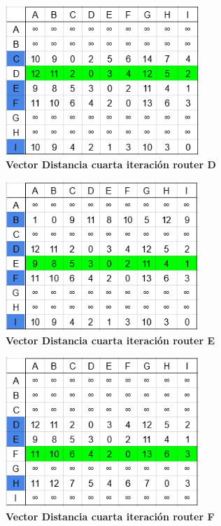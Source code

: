 \documentclass[12pt]{article}
\begin{document}
\begin{figure}[H] 
\centering 
\includegraphics[width=0.65\textwidth]{imagenes/2D4.png} \caption{\small \textbf{Vector Distancia cuarta iteración router D}}
\label{fig:diagrama_47} 
\end{figure}
\begin{figure}[H] 
\centering 
\includegraphics[width=0.65\textwidth]{imagenes/2E4.png} \caption{\small \textbf{Vector Distancia cuarta iteración router E}}
\label{fig:diagrama_48} 
\end{figure}
\begin{figure}[H] 
\centering 
\includegraphics[width=0.65\textwidth]{imagenes/2F4.png} \caption{\small \textbf{Vector Distancia cuarta iteración router F}}
\label{fig:diagrama_49} 
\end{figure}
\end{document}

